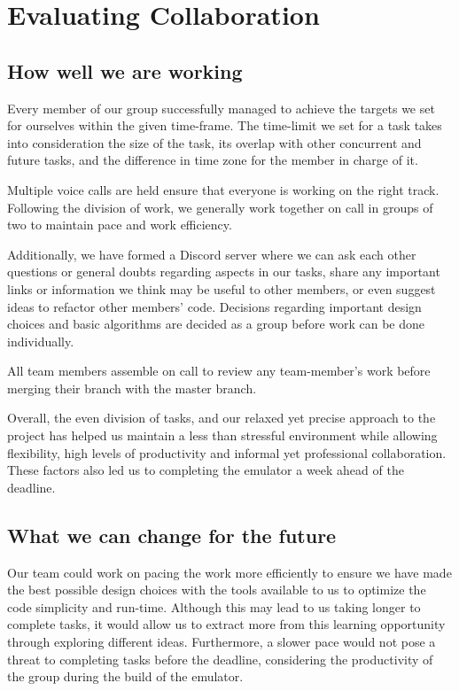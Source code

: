\documentclass[a4paper]{article}
\begin{document}
\section{Evaluating Collaboration}
\subsection{How well we are working}
Every member of our group successfully managed to achieve the targets we set for ourselves within the given time-frame. The time-limit we set for a task takes into consideration the size of the task, its overlap with other concurrent and future tasks, and the difference in time zone for the member in charge of it. 

Multiple voice calls are held ensure that everyone is working on the right track. Following the division of work, we generally work together on call in groups of two to maintain pace and work efficiency.

Additionally, we have formed a Discord server where we can ask each other questions or general doubts regarding aspects in our tasks, share any important links or information we think may be useful to other members, or even suggest ideas to refactor other members' code. Decisions regarding important design choices and basic algorithms are decided as a group before work can be done individually.

All team members assemble on call to review any team-member's work before merging their branch with the master branch.

Overall, the even division of tasks, and our relaxed yet precise approach to the project has helped us maintain a less than stressful environment while allowing flexibility, high levels of productivity and informal yet professional collaboration. These factors also led us to completing the emulator a week ahead of the deadline.

\subsection{What we can change for the future}
Our team could work on pacing the work more efficiently to ensure we have made the best possible design choices with the tools available to us to optimize the code simplicity and run-time. Although this may lead to us taking longer to complete tasks, it would allow us to extract more from this learning opportunity through exploring different ideas. Furthermore, a slower pace would not pose a threat to completing tasks before the deadline, considering the productivity of the group during the build of the emulator.
\end{document}
